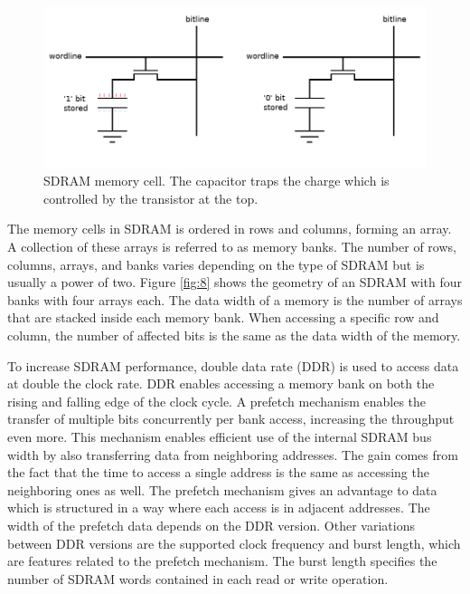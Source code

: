 \documentclass[12pt]{report}
\begin{document}
\begin{figure}[h]
    \centering
    \includegraphics[scale=0.4]{figures/DRAM.jpg}
    \caption{SDRAM memory cell. The capacitor traps the charge which is controlled by the transistor at the top. \citep{SDRAMFLASH}}
    \label{fig:7}
\end{figure}

The memory cells in SDRAM is ordered in rows and columns, forming an array. A collection of these arrays is referred to as memory banks. 
The number of rows, columns, arrays, and banks varies depending on the type of SDRAM but is usually a power of two. Figure \ref{fig:8} shows the geometry of an SDRAM with four banks with four arrays each. The data width of a memory is the number of arrays that are stacked inside each memory bank. When accessing a specific row and column, the number of affected bits is the same as the data width of the memory.
\par
To increase SDRAM performance, double data rate (DDR) is used to access data at double the clock rate. DDR enables accessing a memory bank on both the rising and falling edge of the clock cycle. A prefetch mechanism enables the transfer of multiple bits concurrently per bank access, increasing the throughput even more. This mechanism enables efficient use of the internal SDRAM bus width by also transferring data from neighboring addresses. The gain comes from the fact that the time to access a single address is the same as accessing the neighboring ones as well. The prefetch mechanism gives an advantage to data which is structured in a way where each access is in adjacent addresses. The width of the prefetch data depends on the DDR version. Other variations between DDR versions are the supported clock frequency and burst length, which are features related to the prefetch mechanism. The burst length specifies the number of SDRAM words contained in each read or write operation. \citep{MicronSDRAMGeneral}
\end{document}
